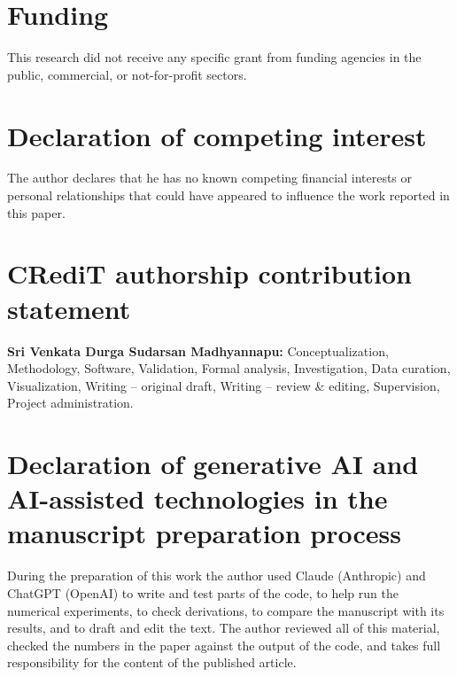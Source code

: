 \documentclass[preprint,12pt]{elsarticle}
\begin{document}
\section*{Funding}
This research did not receive any specific grant from funding agencies in the public, commercial, or not-for-profit sectors.

\section*{Declaration of competing interest}
The author declares that he has no known competing financial interests or personal relationships that could have appeared to influence the work reported in this paper.

\section*{CRediT authorship contribution statement}
\textbf{Sri Venkata Durga Sudarsan Madhyannapu:} Conceptualization, Methodology, Software, Validation, Formal analysis, Investigation, Data curation, Visualization, Writing -- original draft, Writing -- review \& editing, Supervision, Project administration.

\section*{Declaration of generative AI and AI-assisted technologies in the manuscript preparation process}
During the preparation of this work the author used Claude (Anthropic) and ChatGPT (OpenAI) to write and test parts of the code, to help run the numerical experiments, to check derivations, to compare the manuscript with its results, and to draft and edit the text. The author reviewed all of this material, checked the numbers in the paper against the output of the code, and takes full responsibility for the content of the published article.

\appendix
\setcounter{figure}{0}\setcounter{table}{0}
\end{document}
